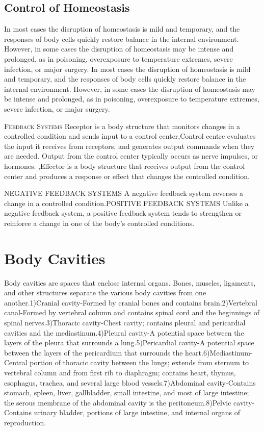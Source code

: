 \documentclass[11pt]{article}
\begin{document}
\subsection{Control of Homeostasis}
In most cases the disruption of
homeostasis is mild and temporary, and the responses of body cells
quickly restore balance in the internal environment. However, in
some cases the disruption of homeostasis may be intense and prolonged,
as in poisoning, overexposure to temperature extremes,
severe infection, or major surgery.
In most cases the disruption of
homeostasis is mild and temporary, and the responses of body cells
quickly restore balance in the internal environment. However, in
some cases the disruption of homeostasis may be intense and prolonged,
as in poisoning, overexposure to temperature extremes,
severe infection, or major surgery.


\textsc{Feedback Systems}
Receptor is a body structure that monitors changes in a controlled
condition and sends input to a control center,Control centre evaluates the input it receives from receptors, and
generates output commands when they are needed. Output from
the control center typically occurs as nerve impulses, or hormones. ,Effector is a body structure that receives output
from the control center and produces a response or effect that
changes the controlled condition.


\textsc{NEGATIVE FEEDBACK SYSTEMS}
A negative feedback system reverses a change in a controlled condition.\textsc{POSITIVE FEEDBACK SYSTEMS}
Unlike a negative feedback system, a
positive feedback system tends to strengthen or reinforce a change
in one of the body’s controlled conditions.
\section{Body Cavities}
Body cavities are spaces that enclose internal organs. Bones, muscles,
ligaments, and other structures separate the various body cavities from
one another.1)Cranial cavity-Formed by cranial bones and contains brain.2)Vertebral canal-Formed by vertebral column and contains spinal
cord and the beginnings of spinal nerves.3)Thoracic cavity-Chest cavity; contains pleural and pericardial
cavities and the mediastinum.4)Pleural cavity-A potential space between the layers of the
pleura that surrounds a lung.5)Pericardial cavity-A potential space between the layers of the
pericardium that surrounds the heart.6)Mediastinum-Central portion of thoracic cavity between the
lungs; extends from sternum to vertebral column
and from first rib to diaphragm; contains heart,
thymus, esophagus, trachea, and several large
blood vessels.7)Abdominal cavity-Contains stomach, spleen, liver, gallbladder,
small intestine, and most of large intestine; the
serous membrane of the abdominal cavity is
the peritoneum.8)Pelvic cavity-Contains urinary bladder, portions of large
intestine, and internal organs of reproduction.
\end{document}
